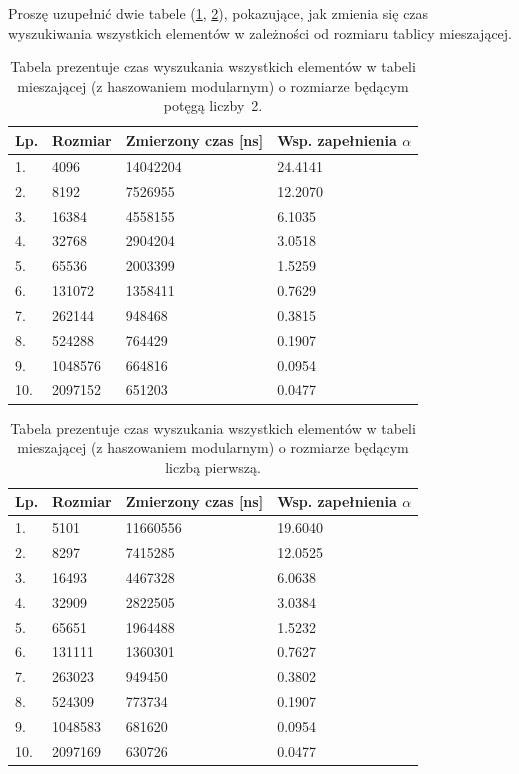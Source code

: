\documentclass[twoside]{article}
\begin{document}
Proszę uzupełnić dwie tabele (\ref{Tab:hash-size-power-2}, \ref{Tab:hash-size-primes}), 
pokazujące, jak zmienia się czas wyszukiwania wszystkich elementów w zależności 
od rozmiaru tablicy mieszającej.

\begin{table}[ht]
\begin{tabular}{|l|l|l|l|}
\hline
Lp. & Rozmiar  & Zmierzony czas [ns] & Wsp. zapełnienia $\alpha$ \\ \hline
1.  & 4096     & 14042204 & 24.4141 \\ \hline
2.  & 8192     & 7526955  & 12.2070 \\ \hline
3.  & 16384    & 4558155  & 6.1035  \\ \hline
4.  & 32768    & 2904204  & 3.0518  \\ \hline
5.  & 65536    & 2003399  & 1.5259  \\ \hline
6.  & 131072   & 1358411  & 0.7629  \\ \hline
7.  & 262144   & 948468   & 0.3815  \\ \hline
8.  & 524288   & 764429   & 0.1907  \\ \hline
9.  & 1048576  & 664816   & 0.0954  \\ \hline
10. & 2097152  & 651203   & 0.0477  \\ \hline
\end{tabular}
\caption{Tabela prezentuje czas wyszukania wszystkich elementów w tabeli mieszającej (z haszowaniem 
modularnym) o rozmiarze będącym potęgą liczby~2.}
\label{Tab:hash-size-power-2}
\end{table}

\begin{table}[h]
\begin{tabular}{|l|l|l|l|}
\hline
Lp. & Rozmiar  & Zmierzony czas [ns] & Wsp. zapełnienia $\alpha$ \\ \hline
1.  & 5101     & 11660556 & 19.6040 \\ \hline
2.  & 8297     & 7415285  & 12.0525 \\ \hline
3.  & 16493    & 4467328  & 6.0638  \\ \hline
4.  & 32909    & 2822505  & 3.0384  \\ \hline
5.  & 65651    & 1964488  & 1.5232  \\ \hline
6.  & 131111   & 1360301  & 0.7627  \\ \hline
7.  & 263023   & 949450   & 0.3802  \\ \hline
8.  & 524309   & 773734   & 0.1907  \\ \hline
9.  & 1048583  & 681620   & 0.0954  \\ \hline
10. & 2097169  & 630726   & 0.0477  \\ \hline
\end{tabular}
\caption{Tabela prezentuje czas wyszukania wszystkich elementów w tabeli mieszającej (z haszowaniem
modularnym) o rozmiarze będącym liczbą pierwszą.}
\label{Tab:hash-size-primes}
\end{table}
\end{document}

